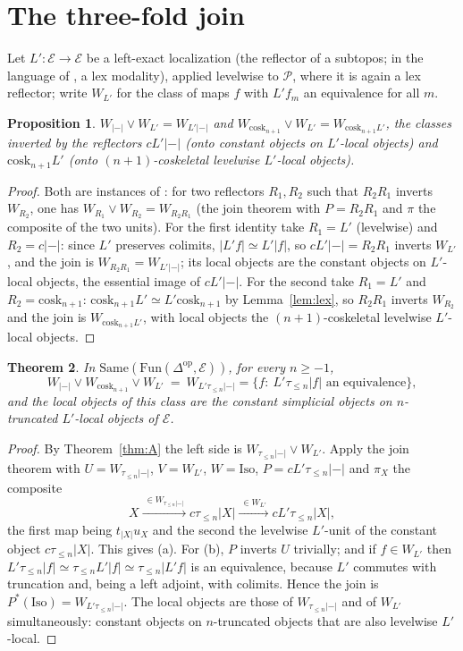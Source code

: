 \documentclass[11pt]{amsart}
\newtheorem{thm}{Theorem}[section]
\newtheorem{prop}[thm]{Proposition}
\theoremstyle{definition}
\newcommand{\Same}{\mathrm{Same}}
\newcommand{\Iso}{\mathrm{Iso}}
\newcommand{\cosk}{\mathrm{cosk}}
\newcommand{\Fun}{\mathrm{Fun}}
\newcommand{\E}{\mathcal E}
\newcommand{\sP}{\mathcal P}
\newcommand{\tr}[1]{\tau_{\le #1}}
\newcommand{\re}{|{-}|}
\begin{document}
\section{The three-fold join}\label{sec:three}

Let $L'\colon\E\to\E$ be a left-exact localization (the reflector of a
subtopos; in the language of \cite{ABFJ}, a lex modality), applied levelwise
to $\sP$, where it is again a lex reflector; write $W_{L'}$ for the class of
maps $f$ with $L'f_m$ an equivalence for all $m$.

\begin{prop}\label{prop:pairs}
$W_{\re}\vee W_{L'}=W_{L'\re}$ and $W_{\cosk_{n+1}}\vee W_{L'}=W_{\cosk_{n+1}L'}$,
the classes inverted by the reflectors $cL'\re$ (onto constant objects on
$L'$-local objects) and $\cosk_{n+1}L'$ (onto $(n{+}1)$-coskeletal levelwise
$L'$-local objects).
\end{prop}
\begin{proof}
Both are instances of \cite[Cor.~4.2]{Postnikov}: for two reflectors $R_1,R_2$
such that $R_2R_1$ inverts $W_{R_2}$, one has $W_{R_1}\vee W_{R_2}=W_{R_2R_1}$
(the join theorem with $P=R_2R_1$ and $\pi$ the composite of the two units).
For the first identity take $R_1=L'$ (levelwise) and $R_2=c\re$: since $L'$
preserves colimits, $|L'f|\simeq L'|f|$, so $cL'\re=R_2R_1$ inverts $W_{L'}$,
and the join is $W_{R_2R_1}=W_{L'\re}$; its local objects are the constant
objects on $L'$-local objects, the essential image of $cL'\re$. For the
second take $R_1=L'$ and $R_2=\cosk_{n+1}$: $\cosk_{n+1}L'\simeq L'\cosk_{n+1}$
by Lemma~\ref{lem:lex}, so $R_2R_1$ inverts $W_{R_2}$ and the join is
$W_{\cosk_{n+1}L'}$, with local objects the $(n{+}1)$-coskeletal levelwise
$L'$-local objects.
\end{proof}

\begin{thm}\label{thm:B}
In $\Same(\Fun(\Delta^{\mathrm{op}},\E))$, for every $n\ge-1$,
\[
W_{\re}\vee W_{\cosk_{n+1}}\vee W_{L'}\ =\ W_{L'\tr n\re}
=\{f:\ L'\tr n|f|\text{ an equivalence}\},
\]
and the local objects of this class are the constant simplicial objects on
$n$-truncated $L'$-local objects of $\E$.
\end{thm}
\begin{proof}
By Theorem~\ref{thm:A} the left side is $W_{\tr n\re}\vee W_{L'}$. Apply the
join theorem with $U=W_{\tr n\re}$, $V=W_{L'}$, $W=\Iso$,
$P=cL'\tr n\re$ and $\pi_X$ the composite
\[
X\xrightarrow{\ \in W_{\tr n\re}\ }c\tr n|X|\xrightarrow{\ \in W_{L'}\ }cL'\tr n|X|,
\]
the first map being $t_{|X|}u_X$ and the second the levelwise $L'$-unit of the
constant object $c\tr n|X|$. This gives (a). For (b), $P$ inverts $U$
trivially; and if $f\in W_{L'}$ then
$L'\tr n|f|\simeq\tr nL'|f|\simeq\tr n|L'f|$ is an equivalence, because $L'$
commutes with truncation and, being a left adjoint, with colimits. Hence the
join is $P^*(\Iso)=W_{L'\tr n\re}$. The local objects are those of
$W_{\tr n\re}$ and of $W_{L'}$ simultaneously: constant objects on
$n$-truncated objects that are also levelwise $L'$-local.
\end{proof}
\end{document}
